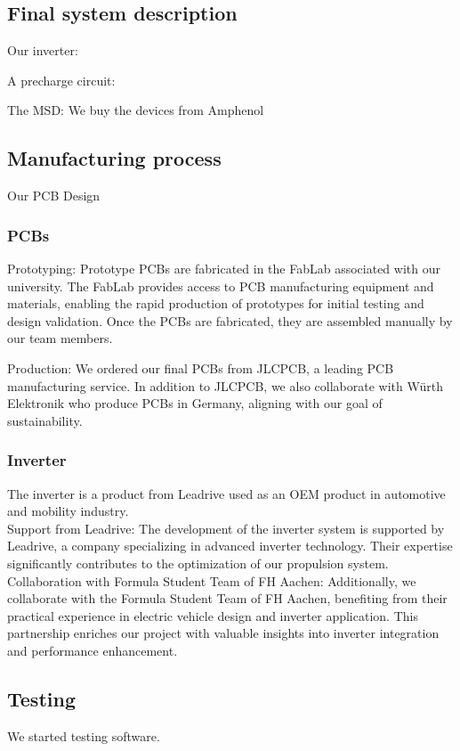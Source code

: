 \subsection{Final system description}
Our inverter:


A precharge circuit:

The MSD: We buy the devices from Amphenol




\subsection{Manufacturing process}
Our PCB Design
\subsubsection{PCBs}
\par Prototyping: Prototype PCBs are fabricated in the FabLab associated with our university. The FabLab provides access to PCB manufacturing equipment and materials, enabling the rapid production of prototypes for initial testing and design validation.
    Once the PCBs are fabricated, they are assembled manually by our team members. 
\par Production: We ordered our final PCBs from JLCPCB, a leading PCB manufacturing service. In addition to JLCPCB, we also collaborate with Würth Elektronik who produce 
PCBs in Germany, aligning with our goal of sustainability.

\subsubsection{Inverter}
The inverter is a product from Leadrive used as an OEM product in automotive and mobility industry. \\

    Support from Leadrive: The development of the inverter system is supported by Leadrive, a company specializing in advanced inverter technology. Their expertise significantly contributes to the optimization of our propulsion system.
    Collaboration with Formula Student Team of FH Aachen: Additionally, we collaborate with the Formula Student Team of FH Aachen, benefiting from their practical experience in electric vehicle design and inverter application. This partnership enriches our project with valuable insights into inverter integration and performance enhancement.

\subsection{Testing}
We started testing software.

